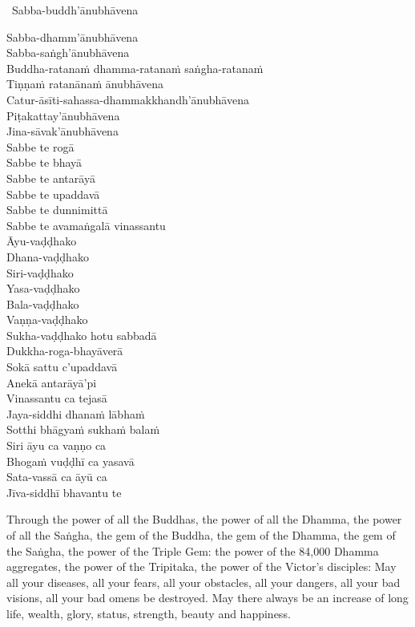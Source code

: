 \begin{pali-leader}
  \anglebracketleft\ \hspace{-0.5mm}Sabba-buddh'ānubhāvena \hspace{-0.5mm}\anglebracketright\
\end{pali-leader}
\begin{pali-hangtogether}
  Sabba-dhamm'ānubhāvena\\
  Sabba-saṅgh'ānubhāvena\\
  Buddha-ratanaṁ dhamma-ratanaṁ saṅgha-ratanaṁ\\
  Tiṇṇaṁ ratanānaṁ ānubhāvena\\
  Catur-āsīti-sahassa-dhammakkhandh'ānubhāvena\\
  Piṭakattay'ānubhāvena\\
  Jina-sāvak'ānubhāvena\\
  Sabbe te rogā\\
  Sabbe te bhayā\\
  Sabbe te antarāyā\\
  Sabbe te upaddavā\\
  Sabbe te dunnimittā\\
  Sabbe te avamaṅgalā vinassantu\\
  Āyu-vaḍḍhako\\
  Dhana-vaḍḍhako\\
  Siri-vaḍḍhako\\
  Yasa-vaḍḍhako\\
  Bala-vaḍḍhako\\
  Vaṇṇa-vaḍḍhako\\
  Sukha-vaḍḍhako hotu sabbadā\\
  Dukkha-roga-bhayāverā\\
  Sokā sattu c'upaddavā\\
  Anekā antarāyā'pi\\
  Vinassantu ca tejasā\\
  Jaya-siddhi dhanaṁ lābhaṁ\\
  Sotthi bhāgyaṁ sukhaṁ balaṁ\\
  Siri āyu ca vaṇṇo ca\\
  Bhogaṁ vuḍḍhī ca yasavā\\
  Sata-vassā ca āyū ca\\
  Jīva-siddhī bhavantu te
\end{pali-hangtogether}

\begin{english-verses}
  Through the power of all the Buddhas, the power of all the Dhamma, the power of all the Saṅgha, the gem of the Buddha, the gem of the Dhamma, the gem of the Saṅgha, the power of the Triple Gem: the power of the 84,000 Dhamma aggregates, the power of the Tripitaka, the power of the Victor's disciples: May all your diseases, all your fears, all your obstacles, all your dangers, all your bad visions, all your bad omens be destroyed. May there always be an increase of long life, wealth, glory, status, strength, beauty and happiness.
\end{english-verses}

